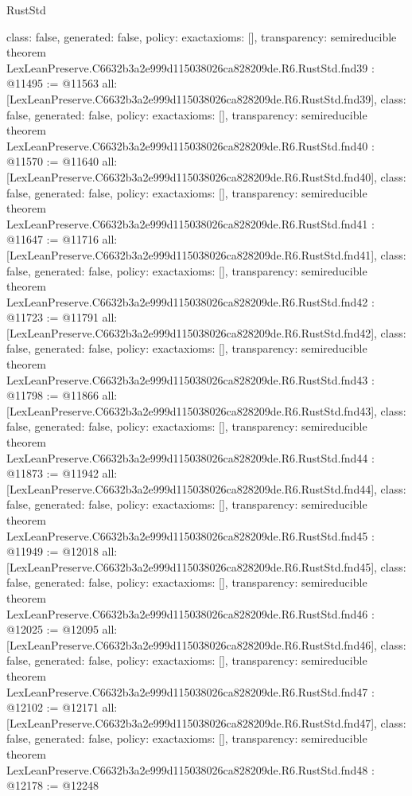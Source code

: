 \begin{lexlean}{RustStd}
\begin{coremodule}
{  class: false,
  generated: false,
  policy: exact{axioms: []},
  transparency: semireducible
}
theorem LexLeanPreserve.C6632b3a2e999d115038026ca828209de.R6.RustStd.fnd39 : @11495 := @11563 {
  all: [LexLeanPreserve.C6632b3a2e999d115038026ca828209de.R6.RustStd.fnd39],
  class: false,
  generated: false,
  policy: exact{axioms: []},
  transparency: semireducible
}
theorem LexLeanPreserve.C6632b3a2e999d115038026ca828209de.R6.RustStd.fnd40 : @11570 := @11640 {
  all: [LexLeanPreserve.C6632b3a2e999d115038026ca828209de.R6.RustStd.fnd40],
  class: false,
  generated: false,
  policy: exact{axioms: []},
  transparency: semireducible
}
theorem LexLeanPreserve.C6632b3a2e999d115038026ca828209de.R6.RustStd.fnd41 : @11647 := @11716 {
  all: [LexLeanPreserve.C6632b3a2e999d115038026ca828209de.R6.RustStd.fnd41],
  class: false,
  generated: false,
  policy: exact{axioms: []},
  transparency: semireducible
}
theorem LexLeanPreserve.C6632b3a2e999d115038026ca828209de.R6.RustStd.fnd42 : @11723 := @11791 {
  all: [LexLeanPreserve.C6632b3a2e999d115038026ca828209de.R6.RustStd.fnd42],
  class: false,
  generated: false,
  policy: exact{axioms: []},
  transparency: semireducible
}
theorem LexLeanPreserve.C6632b3a2e999d115038026ca828209de.R6.RustStd.fnd43 : @11798 := @11866 {
  all: [LexLeanPreserve.C6632b3a2e999d115038026ca828209de.R6.RustStd.fnd43],
  class: false,
  generated: false,
  policy: exact{axioms: []},
  transparency: semireducible
}
theorem LexLeanPreserve.C6632b3a2e999d115038026ca828209de.R6.RustStd.fnd44 : @11873 := @11942 {
  all: [LexLeanPreserve.C6632b3a2e999d115038026ca828209de.R6.RustStd.fnd44],
  class: false,
  generated: false,
  policy: exact{axioms: []},
  transparency: semireducible
}
theorem LexLeanPreserve.C6632b3a2e999d115038026ca828209de.R6.RustStd.fnd45 : @11949 := @12018 {
  all: [LexLeanPreserve.C6632b3a2e999d115038026ca828209de.R6.RustStd.fnd45],
  class: false,
  generated: false,
  policy: exact{axioms: []},
  transparency: semireducible
}
theorem LexLeanPreserve.C6632b3a2e999d115038026ca828209de.R6.RustStd.fnd46 : @12025 := @12095 {
  all: [LexLeanPreserve.C6632b3a2e999d115038026ca828209de.R6.RustStd.fnd46],
  class: false,
  generated: false,
  policy: exact{axioms: []},
  transparency: semireducible
}
theorem LexLeanPreserve.C6632b3a2e999d115038026ca828209de.R6.RustStd.fnd47 : @12102 := @12171 {
  all: [LexLeanPreserve.C6632b3a2e999d115038026ca828209de.R6.RustStd.fnd47],
  class: false,
  generated: false,
  policy: exact{axioms: []},
  transparency: semireducible
}
theorem LexLeanPreserve.C6632b3a2e999d115038026ca828209de.R6.RustStd.fnd48 : @12178 := @12248 {
}
\end{coremodule}
\end{lexlean}
